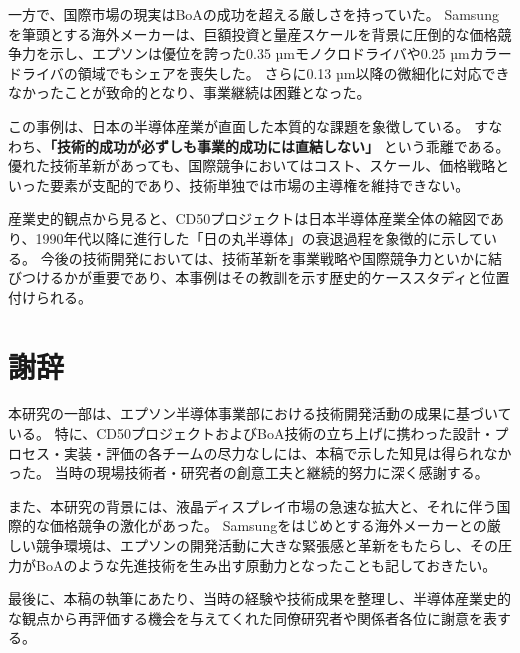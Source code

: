 \documentclass[conference]{IEEEtran}
\begin{document}
一方で、国際市場の現実はBoAの成功を超える厳しさを持っていた。  
Samsungを筆頭とする海外メーカーは、巨額投資と量産スケールを背景に圧倒的な価格競争力を示し、エプソンは優位を誇った0.35 µmモノクロドライバや0.25 µmカラードライバの領域でもシェアを喪失した。  
さらに0.13 µm以降の微細化に対応できなかったことが致命的となり、事業継続は困難となった。

この事例は、日本の半導体産業が直面した本質的な課題を象徴している。  
すなわち、\textbf{「技術的成功が必ずしも事業的成功には直結しない」} という乖離である。  
優れた技術革新があっても、国際競争においてはコスト、スケール、価格戦略といった要素が支配的であり、技術単独では市場の主導権を維持できない。  

産業史的観点から見ると、CD50プロジェクトは日本半導体産業全体の縮図であり、1990年代以降に進行した「日の丸半導体」の衰退過程を象徴的に示している。  
今後の技術開発においては、技術革新を事業戦略や国際競争力といかに結びつけるかが重要であり、本事例はその教訓を示す歴史的ケーススタディと位置付けられる。

\section*{謝辞}
本研究の一部は、エプソン半導体事業部における技術開発活動の成果に基づいている。  
特に、CD50プロジェクトおよびBoA技術の立ち上げに携わった設計・プロセス・実装・評価の各チームの尽力なしには、本稿で示した知見は得られなかった。  
当時の現場技術者・研究者の創意工夫と継続的努力に深く感謝する。  

また、本研究の背景には、液晶ディスプレイ市場の急速な拡大と、それに伴う国際的な価格競争の激化があった。  
Samsungをはじめとする海外メーカーとの厳しい競争環境は、エプソンの開発活動に大きな緊張感と革新をもたらし、その圧力がBoAのような先進技術を生み出す原動力となったことも記しておきたい。  

最後に、本稿の執筆にあたり、当時の経験や技術成果を整理し、半導体産業史的な観点から再評価する機会を与えてくれた同僚研究者や関係者各位に謝意を表する。
\end{document}
